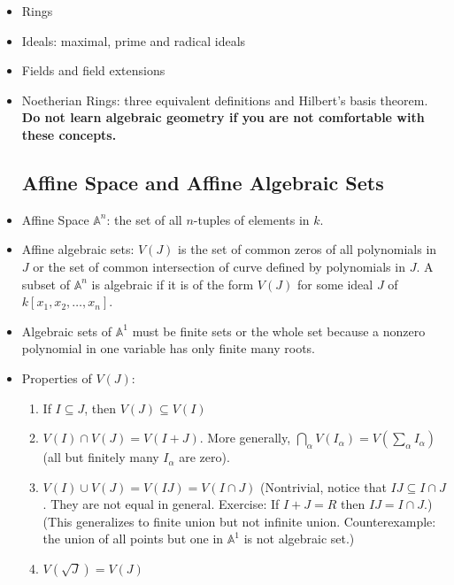 \documentclass[15pt]{scrartcl}
\newcommand{\A}{\mathbb{A}}
\begin{document}
\begin{itemize}
    \subsection{Basic abstract algebra}
    \item Rings
    \item Ideals: maximal, prime and radical ideals
    \item Fields and field extensions
    \item Noetherian Rings: three equivalent definitions and Hilbert's basis theorem. 
    \\

    {\LARGE{\textbf{Do not learn algebraic geometry if you are not comfortable with these concepts.}}}\\
\subsection{Affine Space and Affine Algebraic Sets}
    \item Affine Space $\A^n$: the set of all $n$-tuples of elements in $k$.
    \item Affine algebraic sets: $V(J)$ is the set of common zeros of all polynomials in $J$ or the set of common intersection of curve defined by polynomials in $J$. A subset of $\A^n$ is algebraic if it is of the form $V(J)$ for some ideal $J$ of $k[x_1,x_2,\ldots,x_n]$. 
    \item Algebraic sets of $\A^1$ must be finite sets or the whole set because a nonzero polynomial in one variable has only finite many roots. 
    \item Properties of $V(J)$:
    \begin{enumerate}
        \item If $I\subseteq J$, then $V(J)\subseteq V(I)$
        \item $V(I)\cap V(J)=V(I+J)$. More generally, $\bigcap_{\alpha} V(I_{\alpha})=V(\sum_{\alpha} I_{\alpha})$ (all but finitely many $I_{\alpha}$ are zero).
        \item $V(I)\cup V(J)=V(IJ)=V(I\cap J)$ (Nontrivial, notice that $IJ\subseteq I\cap J$. They are not equal in general. Exercise: If $I+J=R$ then $IJ=I\cap J$.) (This generalizes to finite union but not infinite union. Counterexample: the union of all points but one in $\A^1$ is not algebraic set.)
        \item $V(\sqrt{J})=V(J)$
    \end{enumerate}
\end{itemize}
\newpage 
\end{document}
